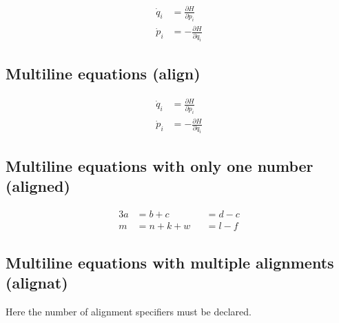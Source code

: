 \begin{filecontents*}{\democodefile}
\begin{align}
  \dot{q}_i & = \frac{\partial H}{\partial p_i} \\
  \dot{p}_i & = -\frac{\partial H}{\partial q_i} 
\end{align}
\end{filecontents*}

\subsection{Multiline equations (align)}

%


\begin{filecontents*}{\democodefile}
\begin{equation}
\begin{aligned}
  \dot{q}_i & = \frac{\partial H}{\partial p_i} \\
  \dot{p}_i & = -\frac{\partial H}{\partial q_i} 
\end{aligned}
\end{equation}
\end{filecontents*}

\subsection{Multiline equations with only one number (aligned)}

%

\begin{filecontents*}{\democodefile}
\begin{alignat}{3}
  a & = b + c     && = d - c \\
  m & = n + k + w && = l - f
\end{alignat}
\end{filecontents*}

\subsection{Multiline equations with multiple alignments (alignat)}
Here the number of alignment specifiers must be declared.

